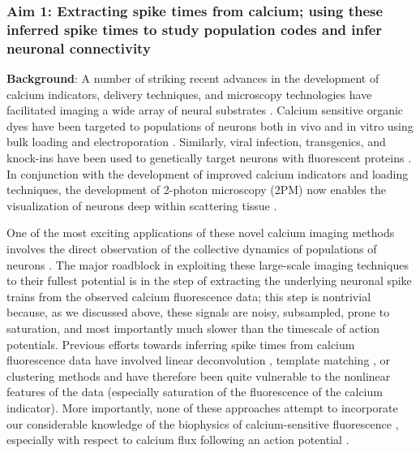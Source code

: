 \documentclass[12pt]{article}
\begin{document}
\subsubsection*{Aim 1: Extracting spike times from calcium; using
these inferred spike times to study population codes and infer
neuronal connectivity}

\noindent \textbf{Background}: A number of striking recent advances in
the development of calcium indicators, delivery techniques, and
microscopy technologies have facilitated imaging a wide array of
neural substrates \cite{SvobodaYasuda06}.  Calcium sensitive organic
dyes \cite{TsienRink82,YusteKatz92} have been targeted to populations
of neurons both in vivo and in vitro using bulk loading
\cite{BrusteinKonnerth03,StosiekKonnerth03} and electroporation
\cite{NagayamaChen07,NevianHelmchen07}.  Similarly, viral infection,
transgenics, and knock-ins have been used to genetically target
neurons with fluorescent proteins
\cite{MiyawakiTsien97,GriesbeckTsien01,NakaiImoto01,ShanerTsien04,GuerreroIsacoff05,OhkuraNakai05}.
In conjunction with the development of improved calcium indicators and
loading techniques, the development of 2-photon microscopy (2PM) now
enables the visualization of neurons deep within scattering tissue
\cite{DenkWebb90,OheimCharpak01,TheerDenk03,HelmchenDenk05,FlusbergSchnitzer05a}.

One of the most exciting applications of these novel calcium imaging
methods involves the direct observation of the collective dynamics of
populations of neurons
\cite{O'MalleyFetcho96,SmettersYuste99,CAR03,IkegayaYuste04,Kerr05,NiellSmith05,OhkiReid05,OhkiReid06,YaksiFriedrich07,NagayamaChen07,SatoSvoboda07,RootWang07,DombeckTank07,Holekamp08}.
The major roadblock in exploiting these large-scale imaging techniques
to their fullest potential is in the step of extracting the underlying
neuronal spike trains from the observed calcium fluorescence data;
this step is nontrivial because, as we discussed above, these signals
are noisy, subsampled, prone to saturation, and most importantly much
slower than the timescale of action potentials.  Previous efforts
towards inferring spike times from calcium fluorescence data have
involved linear deconvolution
\cite{YaksiFriedrich06,RamdyaEngert06,Holekamp08}, template matching
\cite{Kerr05}, or clustering methods \cite{SatoSvoboda07} and have
therefore been quite vulnerable to the nonlinear features of the data
(especially saturation of the fluorescence of the calcium indicator).
More importantly, none of these approaches attempt to incorporate our
considerable knowledge of the biophysics of calcium-sensitive
fluorescence \cite{NeherAugustine92}, especially with respect to
calcium flux following an action potential
\cite{RegehrTank94,TankDelaney95,RegehrAtluri95,FellerTank96,HelmchenSakmann96,MaravallSvoboda00,MajewskaYuste00,CornelisseMansvelder07,Gobel07b}.
\end{document}
